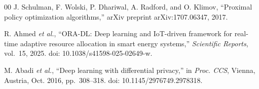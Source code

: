 \documentclass[conference]{IEEEtran}
\begin{document}
\begin{thebibliography}{00}
J. Schulman, F. Wolski, P. Dhariwal, A. Radford, and O. Klimov, ``Proximal policy optimization algorithms,'' arXiv preprint arXiv:1707.06347, 2017.

R. Ahmed \textit{et al.}, ``ORA-DL: Deep learning and IoT-driven framework for real-time adaptive resource allocation in smart energy systems,'' \textit{Scientific Reports}, vol.~15, 2025. doi: 10.1038/s41598-025-02649-w.

M. Abadi \textit{et al.}, ``Deep learning with differential privacy,'' in \textit{Proc. CCS}, Vienna, Austria, Oct. 2016, pp.~308--318. doi: 10.1145/2976749.2978318.

\end{thebibliography}
\end{document}
